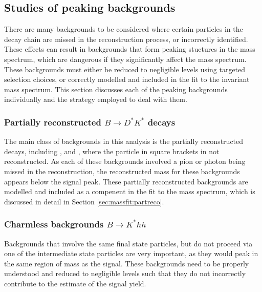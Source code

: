 \subsection{Studies of peaking backgrounds}
\label{sec:backgrounds}

There are many backgrounds to be considered where certain particles in the decay chain are missed in the reconstruction process, or incorrectly identified. These effects can result in backgrounds that form peaking stuctures in the \Bm mass spectrum, which are dangerous if they significantly affect the \Bm mass spectrum. These backgrounds must either be reduced to negligible levels using targeted selection choices, or correctly modelled and included in the fit to the invariant \Bm mass spectrum. This section discusses each of the peaking backgrounds individually and the strategy employed to deal with them.

\subsubsection{Partially reconstructed \boldmath$B \to D^*K^*$ decays}
\label{sec:backgrounds:partreco}

The main class of backgrounds in this analysis is the partially reconstructed \decay{\B}{\Dstar\Kstar} decays, including \decay{\Bm}{(\decay{\Dstarz}{\Dz[\piz]})\Kstarm}, \decay{\Bm}{(\decay{\Dstarz}{\Dz[\gamma]})\Kstarm} and \decay{\Bd}{(\decay{\Dstarp}{\Dz[\pip]})\Kstarm}, where the particle in square brackets in not reconstructed. As each of these backgrounds involved a pion or photon being missed in the reconstruction, the reconstructed \Bm mass for these backgrounds appears below the signal peak. These partially reconstructed backgrounds are modelled and included as a compenent in the fit to the \Bm mass spectrum, which is discussed in detail in Section \ref{sec:massfit:partreco}.

\subsubsection{Charmless backgrounds \boldmath$B \to K^*hh$}
\label{sec:backgrounds:charmless}

Backgrounds that involve the same final state particles, but do not proceed via one of the intermediate state particles are very important, as they would peak in the same region of \Bm mass as the signal. These backgrounds need to be properly understood and reduced to negligible levels such that they do not incorrectly contribute to the estimate of the signal yield. 

